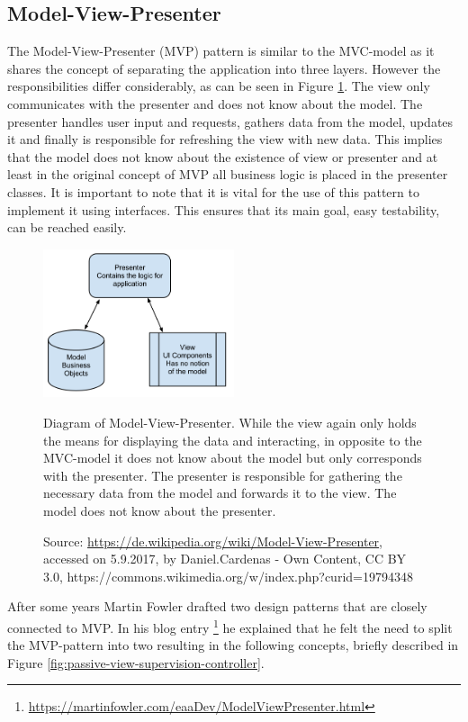 \subsection{Model-View-Presenter}
The Model-View-Presenter (MVP) pattern is similar to the MVC-model as it shares the concept of separating the application into three layers. However the responsibilities differ considerably, as can be seen in Figure \ref{fig:mvp}. The view only communicates with the presenter and does not know about the model. The presenter handles user input and requests, gathers data from the model, updates it and finally is responsible for refreshing the view with new data. This implies that the model does not know about the existence of view or presenter and at least in the original concept of MVP all business logic is placed in the presenter classes. It is important to note that it is vital for the use of this pattern to implement it using interfaces. This ensures that its main goal, easy testability, can be reached easily. 

\begin{figure}[htbp]
	\centering
	\label{fig:mvp}
	\includegraphics[width=0.5\textwidth]{./content/pictures/mvp.png}
	\caption{Diagram of Model-View-Presenter. While the view again only holds the means for displaying the data and interacting, in opposite to the MVC-model it does not know about the model but only corresponds with the presenter. The presenter is responsible for gathering the necessary data from the model and forwards it to the view. The model does not know about the presenter.}
	\caption*{Source: \href{https://de.wikipedia.org/wiki/Model-View-Presenter}{https://de.wikipedia.org/wiki/Model-View-Presenter}, accessed on 5.9.2017, by Daniel.Cardenas - Own Content, CC BY 3.0, https://commons.wikimedia.org/w/index.php?curid=19794348}
\end{figure}


After some years Martin Fowler drafted two design patterns that are closely connected to MVP. In his blog entry \footnote{\href{https://martinfowler.com/eaaDev/ModelViewPresenter.html}{https://martinfowler.com/eaaDev/ModelViewPresenter.html}} he explained that he felt the need to split the MVP-pattern into two resulting in the following concepts, briefly described in Figure \ref{fig:passive-view-supervision-controller}. 

